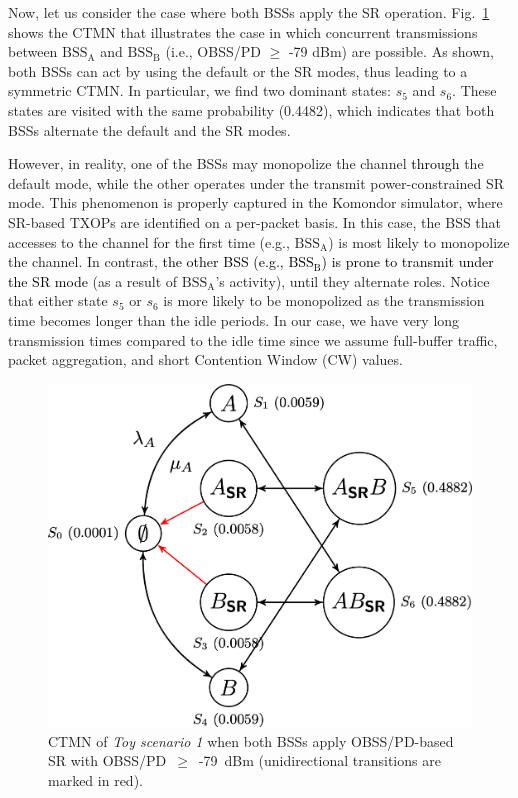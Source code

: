 \documentclass{ieeeaccess}
\begin{document}
Now, let us consider the case where both BSSs apply the SR operation. Fig.~\ref{fig:ctmn_toy_scenario_1c} shows the CTMN that illustrates the case in which concurrent transmissions between $\text{BSS}_\text{A}$ and $\text{BSS}_\text{B}$ (i.e., OBSS/PD $\geq$ -79 dBm) are possible. As shown, both BSSs can act by using the default or the SR modes, thus leading to a symmetric CTMN. In particular, we find two dominant states: $s_5$  and $s_6$. These states are visited with the same probability (0.4482), which indicates that both BSSs alternate the default and the SR modes. 

However, in reality, one of the BSSs may monopolize the channel \textcolor{black}{through} the default mode, while the other operates under the transmit power-constrained SR mode. This phenomenon is properly captured in the Komondor simulator, where SR-based TXOPs are identified on a per-packet basis. In this case, the BSS that accesses to the channel for the first time (e.g., $\text{BSS}_\text{A}$) is most likely to monopolize the channel. In contrast, \textcolor{black}{the other BSS (e.g., $\text{BSS}_\text{B}$) is prone to transmit under the SR mode} (as a result of $\text{BSS}_\text{A}$'s activity), until they alternate roles. Notice that either state $s_5$  or $s_6$ is more likely to be monopolized as the transmission time becomes longer than the idle periods. In our case, we have very long transmission times compared to the idle time since we assume full-buffer traffic, packet aggregation, and short Contention Window (CW) values.

\begin{figure}[ht!]
	\centering    
	\includegraphics[width=.9\columnwidth]{ctmn_toy_scenario_1c}
	\caption{CTMN of \emph{Toy scenario 1} when both BSSs apply OBSS/PD-based SR with OBSS/PD~$\geq$~-79~dBm (unidirectional transitions are marked in red).}
	\label{fig:ctmn_toy_scenario_1c}
\end{figure}
\end{document}
